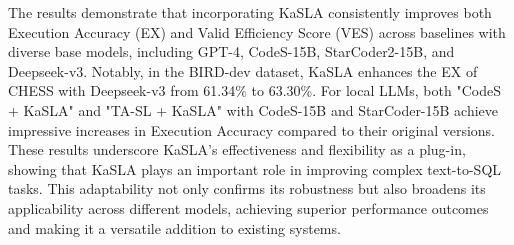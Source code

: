 The results demonstrate that incorporating KaSLA consistently improves both Execution Accuracy (EX) and Valid Efficiency Score (VES) across baselines with diverse base models, including GPT-4, CodeS-15B, StarCoder2-15B, and Deepseek-v3. Notably, in the BIRD-dev dataset, KaSLA enhances the EX of CHESS with Deepseek-v3 from 61.34\% to 63.30\%. For local LLMs, both "CodeS + KaSLA" and "TA-SL + KaSLA" with CodeS-15B and StarCoder-15B achieve impressive increases in Execution Accuracy compared to their original versions. These results underscore KaSLA's effectiveness and flexibility as a plug-in, showing that KaSLA plays an important role in improving complex text-to-SQL tasks. This adaptability not only confirms its robustness but also broadens its applicability across different models, achieving superior performance outcomes and making it a versatile addition to existing systems.

